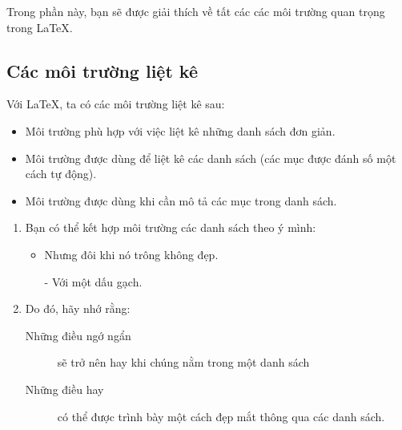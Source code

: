 \noindent Trong phần này, bạn sẽ được giải thích về tất các các môi trường quan trọng trong \LaTeX{}.

\subsection{Các môi trường liệt kê}
Với \LaTeX{}, ta có các môi trường liệt kê sau:
\begin{itemize}
    \item Môi trường  phù hợp với việc liệt kê những danh sách đơn giản.

    \item Môi trường  được dùng để liệt kê các danh sách (các mục được đánh số một cách tự động).

    \item Môi trường  được dùng khi cần mô tả các mục trong danh sách.
\end{itemize}
\begin{example}
\flushleft
\begin{enumerate}
\item Bạn có thể kết
hợp môi trường các danh
sách theo ý mình:
\begin{itemize}
\item Nhưng đôi khi nó
trông
không đẹp.
\item[-] Với một dấu gạch.
\end{itemize}
\item Do đó, hãy nhớ rằng:
\begin{description}
\item[Những điều ngớ ngẩn] sẽ trở
nên hay khi chúng nằm trong một
danh sách
\item[Những điều hay] có thể được
trình bày một cách đẹp
mắt thông qua các danh sách.
\end{description}
\end{enumerate}
\end{example}

